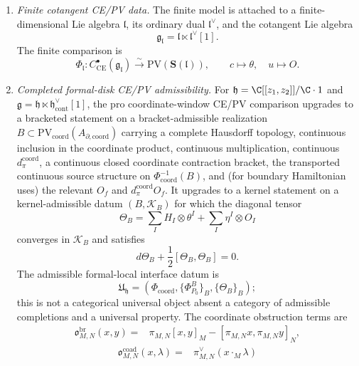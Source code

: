 \begin{enumerate}
  \item \emph{Finite cotangent CE/PV data.}
  The finite model is attached to a finite-dimensional Lie algebra
  \(\mathfrak l\), its ordinary dual \(\mathfrak l^\vee\), and the
  cotangent Lie algebra
  \[
    \mathfrak g_{\mathfrak l}
    =\mathfrak l\ltimes \mathfrak l^\vee[1].
  \]
  The finite comparison is
  \[
    \Phi_{\mathfrak l}\colon
    C^\bullet_{\mathrm{CE}}(\mathfrak g_{\mathfrak l})
    \xrightarrow{\sim}
    \mathrm{PV}(\mathbf S(\mathfrak l)),
    \qquad c\mapsto\theta,\quad u\mapsto O .
  \]

  \item \emph{Completed formal-disk CE/PV admissibility.}
  For
  \(\mathfrak h=\C[[z_1,z_2]]/\C\cdot1\) and
  \(\mathfrak g=\mathfrak h\ltimes
  \mathfrak h^\vee_{\mathrm{cont}}[1]\), the pro coordinate-window
  CE/PV comparison upgrades to a bracketed statement on a
  bracket-admissible realization \(B\subset
  \mathrm{PV}_{\mathrm{coord}}(A_{\partial,\mathrm{coord}})\) carrying
  a complete Hausdorff topology, continuous inclusion in the coordinate
  product, continuous multiplication, continuous
  \(d_\pi^{\mathrm{coord}}\), a continuous closed coordinate
  contraction bracket, the transported continuous source structure on
  \(\Phi_{\mathrm{coord}}^{-1}(B)\), and (for boundary Hamiltonian
  uses) the relevant \(O_f\) and \(d_\pi^{\mathrm{coord}}O_f\).  It
  upgrades to a kernel statement on a kernel-admissible datum
  \((B,\mathcal K_B)\) for which the diagonal tensor
  \[
    \Theta_B=\sum_I H_I\otimes\theta^I+\sum_I\eta^I\otimes O_I
  \]
  converges in \(\mathcal K_B\) and satisfies
  \[
    d\Theta_B+\frac12[\Theta_B,\Theta_B]=0.
  \]
  The admissible formal-local interface datum is
  \[
    \mathfrak U_{\mathfrak h}
    =(\Phi_{\mathrm{coord}},\{\Phi^B_{P_0}\}_B,\{\Theta_B\}_B);
  \]
  this is not a categorical universal object absent a category of
  admissible completions and a universal property.  The coordinate
  obstruction terms are
  \[
    \begin{aligned}
    \mathfrak o^{\mathrm{br}}_{M,N}(x,y)
      ={}&\pi_{M,N}[x,y]_M-[\pi_{M,N}x,\pi_{M,N}y]_N,
    \end{aligned}
  \]
  \[
    \begin{aligned}
    \mathfrak o^{\mathrm{coad}}_{M,N}(x,\lambda)
      ={}&\pi^\vee_{M,N}(x\cdot_M\lambda)\\

\end{aligned}\]
\end{enumerate}
